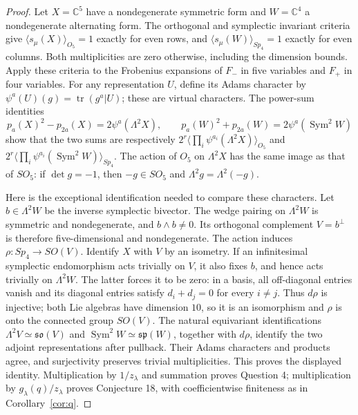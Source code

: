 \documentclass[11pt]{article}
\begin{document}
\begin{proof}
Let $X=\mathbb C^5$ have a nondegenerate symmetric form and
$W=\mathbb C^4$ a nondegenerate alternating form.
The orthogonal and symplectic invariant criteria
\cite[Corollaries 3.3 and 2.3]{DH} give
$\langle s_\mu(X)\rangle_{O_5}=1$ exactly for even rows, and
$\langle s_\mu(W)\rangle_{Sp_4}=1$ exactly for even columns.
Both multiplicities are zero otherwise, including the dimension bounds.
Apply these criteria to the Frobenius expansions of $F_-$ in five
variables and $F_+$ in four variables.
For any representation $U$, define its Adams character by
$\psi^a(U)(g)=\operatorname{tr}(g^a|U)$; these are virtual characters.
The power-sum identities
\[
 p_a(X)^2-p_{2a}(X)=2\psi^a(\Lambda^2X),\qquad
 p_a(W)^2+p_{2a}(W)=2\psi^a(\operatorname{Sym}^2W)
\]
show that the two sums are respectively
$2^r\langle\prod_i\psi^{a_i}(\Lambda^2X)\rangle_{O_5}$ and
$2^r\langle\prod_i\psi^{a_i}(\operatorname{Sym}^2W)\rangle_{Sp_4}$.
The action of $O_5$ on $\Lambda^2X$ has the same image as that of
$SO_5$: if $\det g=-1$, then $-g\in SO_5$ and
$\Lambda^2g=\Lambda^2(-g)$.

Here is the exceptional identification needed to compare these characters.
Let $b\in\Lambda^2W$ be the inverse symplectic bivector. The wedge pairing
on $\Lambda^2W$ is symmetric and nondegenerate, and $b\wedge b\ne0$.
Its orthogonal complement $V=b^\perp$ is therefore five-dimensional
and nondegenerate. The action induces $\rho:Sp_4\to SO(V)$.
Identify $X$ with $V$ by an isometry.
If an infinitesimal symplectic endomorphism acts trivially on $V$, it
also fixes $b$, and hence acts trivially on $\Lambda^2W$.
The latter forces it to be zero: in a basis, all off-diagonal entries
vanish and its diagonal entries satisfy $d_i+d_j=0$ for every $i\ne j$.
Thus $d\rho$ is injective; both Lie algebras have dimension $10$,
so it is an isomorphism and $\rho$ is onto the connected group $SO(V)$.
The natural equivariant identifications
$\Lambda^2V\simeq\mathfrak{so}(V)$ and
$\operatorname{Sym}^2W\simeq\mathfrak{sp}(W)$, together with $d\rho$,
identify the two adjoint representations after pullback.
Their Adams characters and products agree, and surjectivity preserves
trivial multiplicities. This proves the displayed identity.
Multiplication by $1/z_\lambda$ and summation proves Question 4;
multiplication by $g_\lambda(q)/z_\lambda$ proves Conjecture 18,
with coefficientwise finiteness as in Corollary~\ref{cor:q}.
\end{proof}
\end{document}
